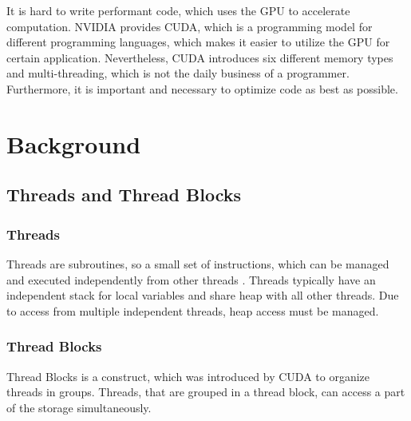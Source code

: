 \documentclass[conference]{IEEEtran}
\begin{document}
	It is hard to write performant code, which uses the GPU to accelerate computation. NVIDIA provides CUDA, which is a programming model for different programming languages, which makes it easier to utilize the GPU for certain application. Nevertheless, CUDA introduces six different memory types and multi-threading, which is not the daily business of a programmer. Furthermore, it is important and necessary to optimize code as best as possible. \cite{nvc}
	
		
	
			

	

\section{Background}

	\subsection{Threads and Thread Blocks}
	
	\subsubsection{Threads}
	Threads are subroutines, so a small set of instructions, which can be managed and executed independently from other threads \cite{?}. Threads typically have an independent stack for local variables and share heap with all other threads. Due to access from multiple independent threads, heap access must be managed.
	
	
	\subsubsection{Thread Blocks}
	Thread Blocks is a construct, which was introduced by CUDA to organize threads in groups. Threads, that are grouped in a thread block, can access a part of the storage simultaneously.
	
\end{document}
